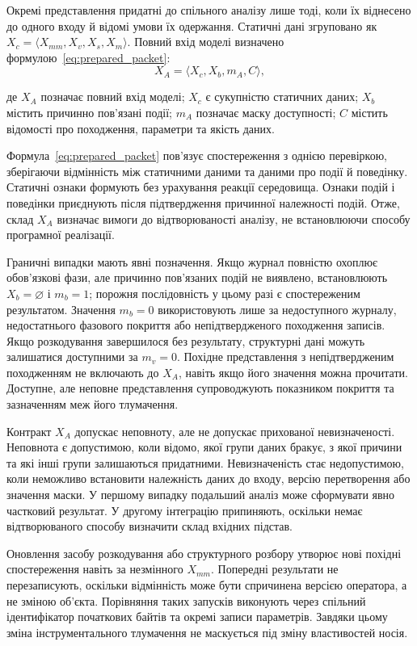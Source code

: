Окремі представлення придатні до спільного аналізу лише тоді, коли їх віднесено до одного входу й відомі умови їх одержання. Статичні дані згруповано як $X_c=\langle X_{mm},X_v,X_s,X_m\rangle$. Повний вхід моделі визначено формулою~\eqref{eq:prepared_packet}:
\begin{equation}
X_A=\langle X_c,X_b,m_A,C\rangle,
\label{eq:prepared_packet}
\end{equation}

де $X_A$ позначає повний вхід моделі; $X_c$ є сукупністю статичних даних; $X_b$ містить причинно пов’язані події; $m_A$ позначає маску доступності; $C$ містить відомості про походження, параметри та якість даних.

Формула~\eqref{eq:prepared_packet} пов’язує спостереження з однією перевіркою, зберігаючи відмінність між статичними даними та даними про події й поведінку. Статичні ознаки формують без урахування реакції середовища. Ознаки подій і поведінки приєднують після підтвердження причинної належності подій. Отже, склад $X_A$ визначає вимоги до відтворюваності аналізу, не встановлюючи способу програмної реалізації.

Граничні випадки мають явні позначення. Якщо журнал повністю охоплює обов’язкові фази, але причинно пов’язаних подій не виявлено, встановлюють $X_b=\varnothing$ і $m_b=1$; порожня послідовність у цьому разі є спостереженим результатом. Значення $m_b=0$ використовують лише за недоступного журналу, недостатнього фазового покриття або непідтвердженого походження записів. Якщо розкодування завершилося без результату, структурні дані можуть залишатися доступними за $m_v=0$. Похідне представлення з непідтвердженим походженням не включають до $X_A$, навіть якщо його значення можна прочитати. Доступне, але неповне представлення супроводжують показником покриття та зазначенням меж його тлумачення.

Контракт $X_A$ допускає неповноту, але не допускає прихованої невизначеності. Неповнота є допустимою, коли відомо, якої групи даних бракує, з якої причини та які інші групи залишаються придатними. Невизначеність стає недопустимою, коли неможливо встановити належність даних до входу, версію перетворення або значення маски. У першому випадку подальший аналіз може сформувати явно частковий результат. У другому інтеграцію припиняють, оскільки немає відтворюваного способу визначити склад вхідних підстав.

Оновлення засобу розкодування або структурного розбору утворює нові похідні спостереження навіть за незмінного $X_{mm}$. Попередні результати не перезаписують, оскільки відмінність може бути спричинена версією оператора, а не зміною об’єкта. Порівняння таких запусків виконують через спільний ідентифікатор початкових байтів та окремі записи параметрів. Завдяки цьому зміна інструментального тлумачення не маскується під зміну властивостей носія.

